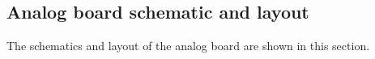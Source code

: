 \newpage
\begin{hugepage}
\subsection{Analog board schematic and layout}
The schematics and layout of the analog board are shown in this section.\\

\pdfpagewidth
\begin{figure}
\centering


\end{figure}
\end{hugepage}
\newpage